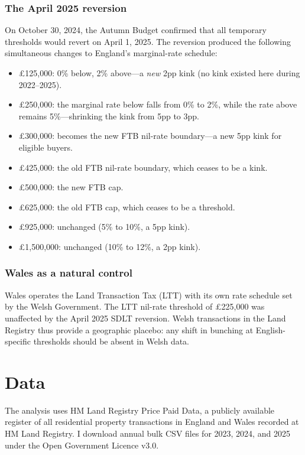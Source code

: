 \documentclass[12pt]{article}
\begin{document}
\subsubsection*{The April 2025 reversion} On October 30, 2024, the Autumn Budget confirmed that all temporary thresholds would revert on April 1, 2025. The reversion produced the following simultaneous changes to England's marginal-rate schedule:
\begin{itemize}
\item \pounds 125,000: 0\% below, 2\% above---a \textit{new} 2pp kink (no kink existed here during 2022--2025).
\item \pounds 250,000: the marginal rate below falls from 0\% to 2\%, while the rate above remains 5\%---shrinking the kink from 5pp to 3pp.
\item \pounds 300,000: becomes the new FTB nil-rate boundary---a new 5pp kink for eligible buyers.
\item \pounds 425,000: the old FTB nil-rate boundary, which ceases to be a kink.
\item \pounds 500,000: the new FTB cap.
\item \pounds 625,000: the old FTB cap, which ceases to be a threshold.
\item \pounds 925,000: unchanged (5\% to 10\%, a 5pp kink).
\item \pounds 1,500,000: unchanged (10\% to 12\%, a 2pp kink).
\end{itemize}

\subsubsection*{Wales as a natural control} Wales operates the Land Transaction Tax (LTT) with its own rate schedule set by the Welsh Government. The LTT nil-rate threshold of \pounds 225,000 was unaffected by the April 2025 SDLT reversion. Welsh transactions in the Land Registry thus provide a geographic placebo: any shift in bunching at English-specific thresholds should be absent in Welsh data.


\section{Data}\label{sec:data}

The analysis uses HM Land Registry Price Paid Data, a publicly available register of all residential property transactions in England and Wales recorded at HM Land Registry. I download annual bulk CSV files for 2023, 2024, and 2025 under the Open Government Licence v3.0.
\end{document}
